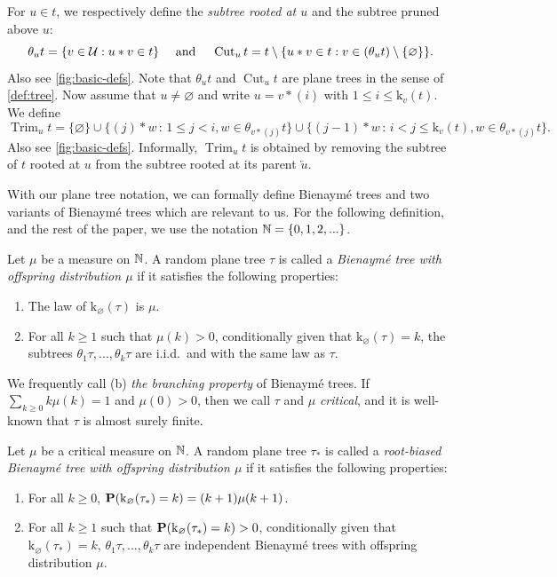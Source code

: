 \documentclass[11pt,reqno]{amsart}
\newcommand{\rk}{\mathrm{k}}
\newcommand{\Cut}{\operatorname{Cut}}
\newcommand{\Trim}{\operatorname{Trim}}
\renewcommand{\emptyset}{\varnothing}
\begin{document}
For $u\in t$, we respectively define the \emph{subtree rooted at $u$} and the subtree pruned above $u$:
\[\theta_u t=\{v\in \U :u*v\in t\}\quad\text{ and }\quad \Cut_u t=t\setminus\{u*v\in t: v\in (\theta_u t)\setminus\{\varnothing\}\}.\]
Also see \cref{fig:basic-defs}. 
Note that $\theta_u t$ and $\Cut_u t$ are plane trees in the sense of \cref{def:tree}. Now assume that $u\neq\varnothing$ and write $u=v*(i)$ with $1\leq i\leq \rk_v(t)$. We define
\[\Trim_u t=\{\varnothing\}\cup\{(j)*w\, :\, 1\leq j<i,w\in\theta_{v*(j)}t\}\cup\{(j-1)*w\, :\, i< j\leq \rk_v(t),w\in\theta_{v*(j)}t\}.\]
Also see \cref{fig:basic-defs}. 
Informally, $\Trim_u t$ is obtained by removing the subtree of $t$ rooted at $u$ from the subtree rooted at its parent $\overleftarrow{u}$.

With our plane tree notation, we can formally define Bienaym\'{e} trees and two variants of Bienaym\'{e} trees which are relevant to us. For the following definition, and the rest of the paper, we use the notation $\mathbb{N} = \{0,1,2,...\}$.

\begin{defn}
Let $\mu$ be a measure on $\mathbb{N}$. A random plane tree $\tau$ is called a \emph{Bienaym\'{e} tree with offspring distribution $\mu$} if it satisfies the following properties:
\begin{enumerate}
    \item[(a)] The law of $\rk_\emptyset(\tau)$ is $\mu$.
    \item[(b)] For all $k \geq 1$ such that $\mu(k) > 0$, conditionally given that $\rk_\emptyset(\tau) = k$, the subtrees $\theta_1\tau,...,\theta_k\tau$ are i.i.d.~and with the same law as $\tau$.
\end{enumerate}
We frequently call (b) \emph{the branching property} of Bienaymé trees. If $\sum_{k \geq 0} k\mu(k) = 1$ and $\mu(0) > 0$, then we call $\tau$ and $\mu$ \emph{critical}, and it is well-known that $\tau$ is almost surely finite.
\end{defn}

\begin{defn}
\label{def:root-biased}
Let $\mu$ be a critical measure on $\mathbb{N}$. A random plane tree $\tau_*$ is called a \emph{root-biased Bienaym\'{e} tree with offspring distribution $\mu$} if it satisfies the following properties:
\begin{enumerate}
    \item[(a)] For all $k \geq 0$, $\prob(\rk_\emptyset(\tau_*) = k) = (k+1)\mu(k+1)$.
    \item[(b)] For all $k \geq 1$ such that $\prob(\rk_\emptyset(\tau_*) = k) > 0$, conditionally given that $\rk_{\emptyset}(\tau_*) = k$, $\theta_1\tau,...,\theta_k\tau$ are independent Bienaym\'{e} trees with offspring distribution $\mu$.
\end{enumerate}
\end{defn}
\end{document}
